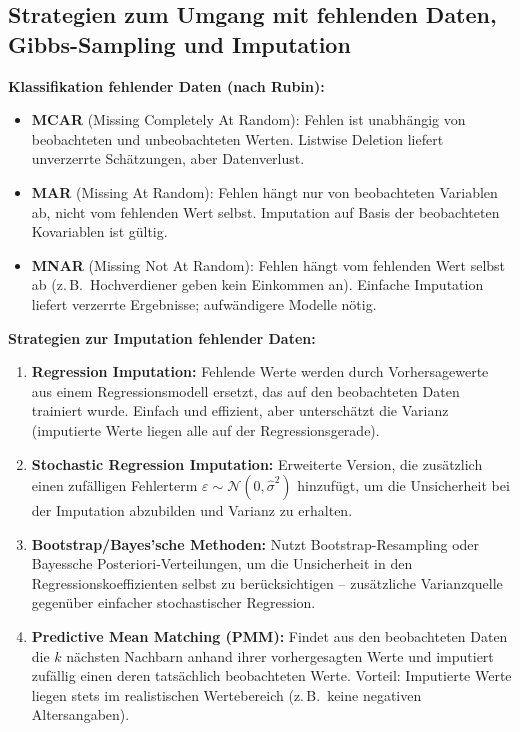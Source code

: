 \newpage

\subsection{Strategien zum Umgang mit fehlenden Daten, Gibbs-Sampling und Imputation}

\textbf{Klassifikation fehlender Daten (nach Rubin):}
\begin{itemize}[leftmargin=1.5em]
    \item \textbf{MCAR} (Missing Completely At Random): Fehlen ist unabhängig von beobachteten und unbeobachteten Werten. Listwise Deletion liefert unverzerrte Schätzungen, aber Datenverlust.
    \item \textbf{MAR} (Missing At Random): Fehlen hängt nur von beobachteten Variablen ab, nicht vom fehlenden Wert selbst. Imputation auf Basis der beobachteten Kovariablen ist gültig.
    \item \textbf{MNAR} (Missing Not At Random): Fehlen hängt vom fehlenden Wert selbst ab (z.\,B.\ Hochverdiener geben kein Einkommen an). Einfache Imputation liefert verzerrte Ergebnisse; aufwändigere Modelle nötig.
\end{itemize}

\textbf{Strategien zur Imputation fehlender Daten:}

\begin{enumerate}[leftmargin=1.5em]
    \item \textbf{Regression Imputation:} Fehlende Werte werden durch Vorhersagewerte aus einem Regressionsmodell ersetzt, das auf den beobachteten Daten trainiert wurde. Einfach und effizient, aber unterschätzt die Varianz (imputierte Werte liegen alle auf der Regressionsgerade).

    \item \textbf{Stochastic Regression Imputation:} Erweiterte Version, die zusätzlich einen zufälligen Fehlerterm $\varepsilon \sim \mathcal{N}(0, \hat{\sigma}^2)$ hinzufügt, um die Unsicherheit bei der Imputation abzubilden und Varianz zu erhalten.

    \item \textbf{Bootstrap/Bayes'sche Methoden:} Nutzt Bootstrap-Resampling oder Bayessche Posteriori-Verteilungen, um die Unsicherheit in den Regressionskoeffizienten selbst zu berücksichtigen -- zusätzliche Varianzquelle gegenüber einfacher stochastischer Regression.

    \item \textbf{Predictive Mean Matching (PMM):} Findet aus den beobachteten Daten die $k$ nächsten Nachbarn anhand ihrer vorhergesagten Werte und imputiert zufällig einen deren tatsächlich beobachteten Werte. Vorteil: Imputierte Werte liegen stets im realistischen Wertebereich (z.\,B.\ keine negativen Altersangaben).
\end{enumerate}

